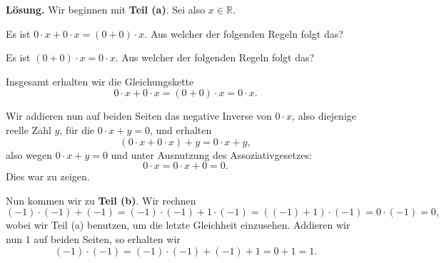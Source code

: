 \documentclass{ximera}
\begin{document}
\textbf{Lösung.}
Wir beginnen mit \textbf{Teil (a)}. Sei also $x\in\mathbb R$.

\begin{question}
Es ist $0\cdot x + 0\cdot x = (0+0)\cdot x$. Aus welcher der folgenden Regeln folgt das?
\begin{solution}
\begin{multiple-choice}[4]
\end{multiple-choice}
\end{solution}
\end{question}

\begin{question}
Es ist $(0+0)\cdot x = 0\cdot x$. Aus welcher der folgenden Regeln folgt das?
\begin{solution}
\begin{multiple-choice}[4]
\end{multiple-choice}
\end{solution}
\end{question}


Insgesamt erhalten wir die Gleichungskette
\[
0\cdot x + 0\cdot x = (0+0)\cdot x = 0\cdot x.
\]

Wir addieren nun auf beiden Seiten das negative Inverse von $0\cdot x$, also diejenige reelle Zahl $y$, für die $0\cdot x + y  = 0$, und erhalten
\[
(0\cdot x + 0\cdot x) + y = 0\cdot x+ y,
\]
also wegen $0\cdot x + y  = 0$ und unter Ausnutzung des Assoziativgesetzes:
\[
0\cdot x = 0\cdot x + 0 = 0.
\]
Dies war zu zeigen.


Nun kommen wir zu \textbf{Teil (b)}.
Wir rechnen
\[
(-1)\cdot (-1) + (-1) = (-1)\cdot (-1) + 1\cdot (-1) = ((-1)+1) \cdot (-1) = 0\cdot (-1) = 0,
\]
wobei wir Teil (a) benutzen, um die letzte Gleichheit einzusehen.
Addieren wir nun $1$ auf beiden Seiten, so erhalten wir
\[
(-1)\cdot (-1) = (-1)\cdot (-1) + (-1) + 1 = 0+1= 1.
\]
\end{document}
